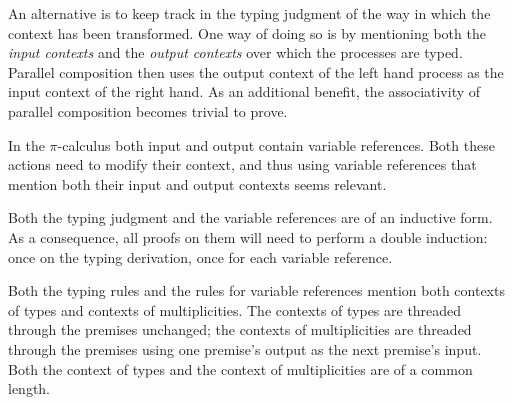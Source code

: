 \documentclass[a4paper,UKenglish,cleveref, autoref, thm-restate,authorcolumns]{lipics-v2019}
\theoremstyle{definition}
\newcommand{\picalc}{$\pi$-calculus}
\begin{document}
An alternative is to keep track in the typing judgment of the way in which the context has been transformed.
One way of doing so is by mentioning both the \emph{input contexts} and the \emph{output contexts} over which the processes are typed.
Parallel composition then uses the output context of the left hand process as the input context of the right hand.
As an additional benefit, the associativity of parallel composition becomes trivial to prove.

In the \picalc{} both input and output contain variable references.
Both these actions need to modify their context, and thus using variable references that mention both their input and output contexts seems relevant.

Both the typing judgment and the variable references are of an inductive form.
As a consequence, all proofs on them will need to perform a double induction: once on the typing derivation, once for each variable reference.

Both the typing rules and the rules for variable references mention both contexts of types and contexts of multiplicities.
The contexts of types are threaded through the premises unchanged; the contexts of multiplicities are threaded through the premises using one premise's output as the next premise's input.
Both the context of types and the context of multiplicities are of a common length.
\end{document}
